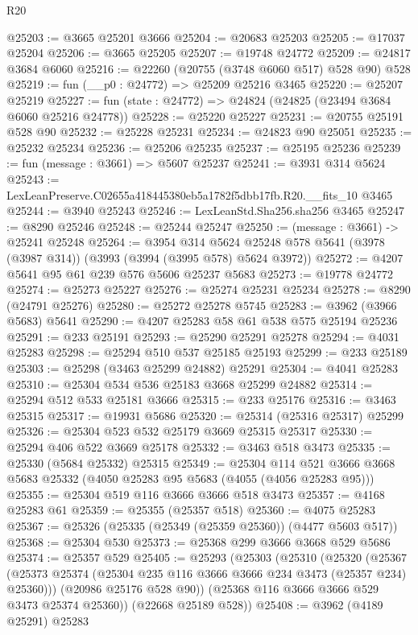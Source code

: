 \begin{lexlean}{R20}
\begin{coremodule}
@25203 := @3665 @25201 @3666
@25204 := @20683 @25203
@25205 := @17037 @25204
@25206 := @3665 @25205
@25207 := @19748 @24772
@25209 := @24817 @3684 @6060
@25216 := @22260 (@20755 (@3748 @6060 @517) @528 @90) @528
@25219 := fun (__p0 : @24772) => @25209 @25216 @3465
@25220 := @25207 @25219
@25227 := fun (state : @24772) => @24824 (@24825 (@23494 @3684 @6060 @25216 @24778))
@25228 := @25220 @25227
@25231 := @20755 @25191 @528 @90
@25232 := @25228 @25231
@25234 := @24823 @90 @25051
@25235 := @25232 @25234
@25236 := @25206 @25235
@25237 := @25195 @25236
@25239 := fun (message : @3661) => @5607 @25237
@25241 := @3931 @314 @5624
@25243 := LexLeanPreserve.C02655a418445380eb5a1782f5dbb17fb.R20.__fits_10 @3465
@25244 := @3940 @25243
@25246 := LexLeanStd.Sha256.sha256 @3465
@25247 := @8290 @25246
@25248 := @25244 @25247
@25250 := (message : @3661) -> @25241 @25248
@25264 := @3954
    @314
    @5624
    @25248
    @578
    @5641
    (@3978 (@3987 @314))
    (@3993 (@3994 (@3995 @578) @5624 @3972))
@25272 := @4207 @5641 @95 @61 @239 @576 @5606 @25237 @5683
@25273 := @19778 @24772
@25274 := @25273 @25227
@25276 := @25274 @25231 @25234
@25278 := @8290 (@24791 @25276)
@25280 := @25272 @25278 @5745
@25283 := @3962 (@3966 @5683) @5641
@25290 := @4207 @25283 @58 @61 @538 @575 @25194 @25236
@25291 := @233 @25191
@25293 := @25290 @25291 @25278
@25294 := @4031 @25283
@25298 := @25294 @510 @537 @25185 @25193
@25299 := @233 @25189
@25303 := @25298 (@3463 @25299 @24882) @25291
@25304 := @4041 @25283
@25310 := @25304 @534 @536 @25183 @3668 @25299 @24882
@25314 := @25294 @512 @533 @25181 @3666
@25315 := @233 @25176
@25316 := @3463 @25315
@25317 := @19931 @5686
@25320 := @25314 (@25316 @25317) @25299
@25326 := @25304 @523 @532 @25179 @3669 @25315 @25317
@25330 := @25294 @406 @522 @3669 @25178
@25332 := @3463 @518 @3473
@25335 := @25330 (@5684 @25332) @25315
@25349 := @25304
    @114
    @521
    @3666
    @3668
    @5683
    @25332
    (@4050 @25283 @95 @5683 (@4055 (@4056 @25283 @95)))
@25355 := @25304 @519 @116 @3666 @3666 @518 @3473
@25357 := @4168 @25283 @61
@25359 := @25355 (@25357 @518)
@25360 := @4075 @25283
@25367 := @25326 (@25335 (@25349 (@25359 @25360)) (@4477 @5603 @517))
@25368 := @25304 @530
@25373 := @25368 @299 @3666 @3668 @529 @5686
@25374 := @25357 @529
@25405 := @25293
    (@25303
      (@25310
        (@25320
          (@25367 (@25373 @25374 (@25304 @235 @116 @3666 @3666 @234 @3473 (@25357 @234) @25360)))
          (@20986 @25176 @528 @90))
        (@25368 @116 @3666 @3666 @529 @3473 @25374 @25360))
      (@22668 @25189 @528))
@25408 := @3962 (@4189 @25291) @25283

\end{coremodule}
\end{lexlean}
